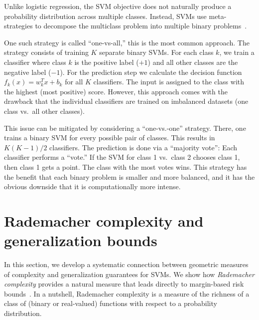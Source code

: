 Unlike logistic regression, the SVM objective does not naturally produce a probability distribution across multiple classes. Instead, SVMs use meta-strategies to decompose the multiclass problem into multiple binary problems~\cite{hsu2002comparison}.

One such strategy is called ``one-vs-all,'' this is the most common approach. The strategy consists of training $K$ separate binary SVMs. For each class $k$, we train a classifier where class $k$ is the positive label ($+1$) and all other classes are the negative label ($-1$). For the prediction step we calculate the decision function $f_k(x) = w_k^T x  + b_k$ for all $K$ classifiers. The input is assigned to the class with the highest (most positive) score.
However, this approach comes with the drawback that
the individual classifiers are trained on imbalanced datasets (one class vs.\ all other classes). 

This issue can be mitigated by considering a
``one-vs.-one'' strategy. There, one trains a binary SVM for every possible pair of classes. This results in $K(K-1)/2$ classifiers. The prediction is done via a ``majority vote'': Each classifier performs a ``vote.'' If the SVM for class 1 vs.\ class 2 chooses class 1, then class 1 gets a point. The class with the most votes wins. This strategy  has the benefit that each binary problem is smaller and more balanced, and it has the obvious downside that it is computationally more intense.


\section{Rademacher complexity and generalization bounds}\label{ss:rademacher}

In this section, we develop a systematic connection between geometric measures of complexity and generalization guarantees for SVMs.
We show how {\em Rademacher complexity} provides a natural measure that leads directly to margin-based risk bounds~\cite{bartlett2002rademacher,koltchinskii2000rademacher,shalev2014understanding}. In a nutshell, Rademacher complexity is a measure of the richness of a class of (binary or real-valued) functions with respect to a probability distribution.



